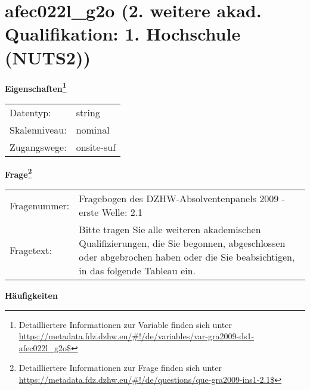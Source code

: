 
    \setcounter{footnote}{0}

    \vspace*{-1.8cm}
	\section{afec022l\_g2o (2. weitere akad. Qualifikation: 1. Hochschule (NUTS2))}
	\label{section:afec022l_g2o}



    \vspace*{0.5cm}
    \noindent\textbf{Eigenschaften\footnote{Detailliertere Informationen zur Variable finden sich unter
		\url{https://metadata.fdz.dzhw.eu/\#!/de/variables/var-gra2009-ds1-afec022l_g2o$}}}\\
	\begin{tabularx}{\hsize}{@{}lX}
	Datentyp: & string \\
	Skalenniveau: & nominal \\
	Zugangswege: &
	  onsite-suf
 \\
    \end{tabularx}



				\vspace*{0.5cm}
                \noindent\textbf{Frage\footnote{Detailliertere Informationen zur Frage finden sich unter
		              \url{https://metadata.fdz.dzhw.eu/\#!/de/questions/que-gra2009-ins1-2.1$}}}\\
				\begin{tabularx}{\hsize}{@{}lX}
					Fragenummer: &
					  Fragebogen des DZHW-Absolventenpanels 2009 - erste Welle:
					  2.1
 \\
					Fragetext: & Bitte tragen Sie alle weiteren akademischen Qualifizierungen, die Sie begonnen, abgeschlossen oder abgebrochen haben oder die Sie beabsichtigen, in das folgende Tableau ein. \\
				\end{tabularx}





        		\vspace*{0.5cm}
                \noindent\textbf{Häufigkeiten}

